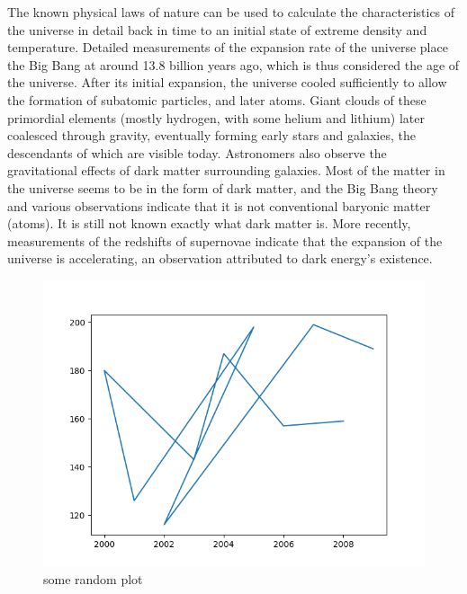 \documentclass[14pt, twoside]{report}
\begin{document}
The known physical laws of nature can be used to calculate the characteristics of the universe in detail back in time to an initial state of extreme density and temperature. Detailed measurements of the expansion rate of the universe place the Big Bang at around 13.8 billion years ago, which is thus considered the age of the universe. After its initial expansion, the universe cooled sufficiently to allow the formation of subatomic particles, and later atoms. Giant clouds of these primordial elements (mostly hydrogen, with some helium and lithium) later coalesced through gravity, eventually forming early stars and galaxies, the descendants of which are visible today. Astronomers also observe the gravitational effects of dark matter surrounding galaxies. Most of the matter in the universe seems to be in the form of dark matter, and the Big Bang theory and various observations indicate that it is not conventional baryonic matter (atoms). It is still not known exactly what dark matter is. More recently, measurements of the redshifts of supernovae indicate that the expansion of the universe is accelerating, an observation attributed to dark energy's existence.

\begin{figure}[h]
	\centering
	\includegraphics[height=0.3\textheight, keepaspectratio]{images/plot1.png}
	\caption{some random plot}
	\label{fig1}
\end{figure}
\end{document}
